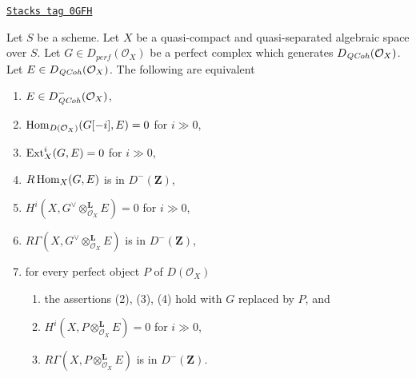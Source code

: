 \begin{proposition}
\label{spaces-perfect-proposition-detecting-bounded-above}
\href{https://stacks.math.columbia.edu/tag/0GFH}{\texttt{Stacks tag 0GFH}}

Let $S$ be a scheme.
Let $X$ be a quasi-compact and quasi-separated algebraic space over $S$.
Let $G \in D_{perf}(\mathcal{O}_X)$ be a perfect complex which generates
$D_{\mathit{QCoh}} (\mathcal{O}_X)$. Let $E \in D_{\mathit{QCoh}} (\mathcal{O}_X)$.
The following are equivalent
\begin{enumerate}
\item $E \in D^-_{\mathit{QCoh}} (\mathcal{O}_X)$,
\item $\operatorname{Hom}_{D(\mathcal{O}_X)}(G[-i], E) = 0$ for $i \gg 0$,
\item $\operatorname{Ext}^i_X(G, E) = 0$ for $i \gg 0$,
\item $R\operatorname{Hom}_X(G, E)$ is in $D^-(\mathbf{Z})$,
\item $H^i(X, G^\vee \otimes_{\mathcal{O}_X}^\mathbf{L} E) = 0$
for $i \gg 0$,
\item $R\Gamma(X, G^\vee \otimes_{\mathcal{O}_X}^\mathbf{L} E)$
is in $D^-(\mathbf{Z})$,
\item for every perfect object $P$ of $D(\mathcal{O}_X)$
\begin{enumerate}
\item the assertions (2), (3), (4) hold with $G$ replaced by $P$, and
\item $H^i(X, P \otimes_{\mathcal{O}_X}^\mathbf{L} E) = 0$ for $i \gg 0$,
\item $R\Gamma(X, P \otimes_{\mathcal{O}_X}^\mathbf{L} E)$
is in $D^-(\mathbf{Z})$.
\end{enumerate}
\end{enumerate}
\end{proposition}

